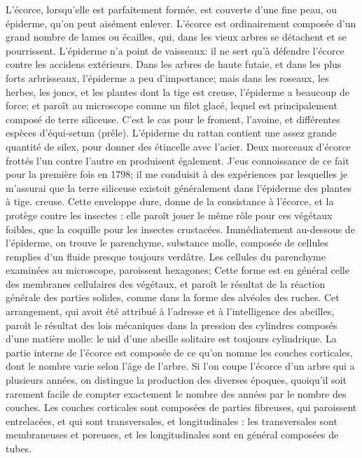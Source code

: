 L'écorce, lorsqu'elle est parfaitement formée, est couverte d'une fine peau, ou épiderme, qu'on peut aisément enlever. L'écorce est ordinairement composée d'un grand nombre de lames ou écailles, qui, dans les vieux arbres se détachent et se pourrissent. L'épiderme n'a point de vaisseaux: il ne sert qu'à défendre l'écorce contre les accidens extérieurs. Dans les arbres de haute futaie, et dans les plus forts arbrisseaux, l'épiderme a peu d'importance; mais dans les roseaux, les herbes, les joncs, et les plantes dont la tige est creuse, l'épiderme a beaucoup de force; et paroît au microscope comme un filet glacé, lequel est principalement composé de terre siliceuse. C'est le cas pour le froment, l'avoine, et différentes espèces d'équi-setum (prêle). L'épiderme du rattan contient une assez grande quantité de silex, pour donner des étincelle avec l'acier. Deux morceaux d'écorce frottés l'un contre l'autre en produisent également. J'eus connoissance de ce fait pour la première fois en 1798; il me conduisit à des expériences par lesquelles je m'assurai que la terre siliceuse existoit généralement dans l'épiderme des plantes à tige.\setcounter{page}{376} creuse. Cette enveloppe dure, donne de la consistance à l'écorce, et la protège contre les insectes : elle paroît jouer le même rôle pour ces végétaux foibles, que la coquille pour les insectes crustacées.
Immédiatement au-dessous de l'épiderme, on trouve le parenchyme, substance molle, composée de cellules remplies d'un fluide presque toujours verdâtre. Les cellules du parenchyme examinées au microscope, paroissent hexagones; Cette forme est en général celle des membranes cellulaires des végétaux, et paroît le résultat de la réaction générale des parties solides, comme dans la forme des alvéoles des ruches. Cet arrangement, qui avoit été attribué à l'adresse et à l'intelligence des abeilles, paroît le résultat des lois mécaniques dans la pression des cylindres composés d'une matière molle: le nid d'une abeille solitaire est toujours cylindrique.
La partie interne de l'écorce est composée de ce qu'on nomme les couches corticales, dont le nombre varie selon l'âge de l'arbre. Si l'on coupe l'écorce d'un arbre qui a plusieurs années, on distingue la production des diverses époques, quoiqu'il soit rarement facile de compter exactement le nombre des années par le nombre des couches.\setcounter{page}{377} Les couches corticales sont composées de parties fibreuses, qui paroissent entrelacées, et qui sont transversales, et longitudinales : les transversales sont membraneuses et poreuses, et les longitudinales sont en général composées de tubes.
